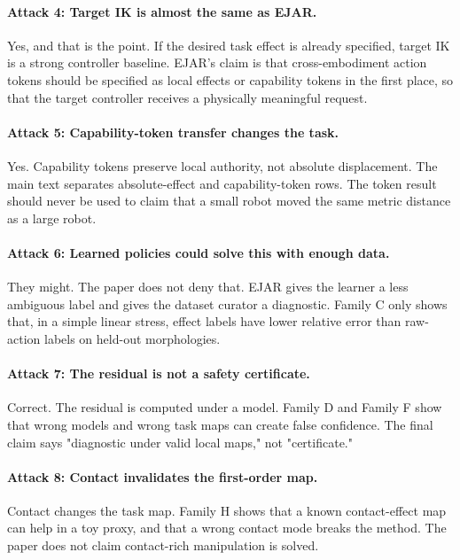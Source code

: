 \documentclass{article}
\begin{document}
\paragraph{Attack 4: Target IK is almost the same as EJAR.}
Yes, and that is the point. If the desired task effect is already specified, target IK is a strong controller baseline. EJAR's claim is that cross-embodiment action tokens should be specified as local effects or capability tokens in the first place, so that the target controller receives a physically meaningful request.

\paragraph{Attack 5: Capability-token transfer changes the task.}
Yes. Capability tokens preserve local authority, not absolute displacement. The main text separates absolute-effect and capability-token rows. The token result should never be used to claim that a small robot moved the same metric distance as a large robot.

\paragraph{Attack 6: Learned policies could solve this with enough data.}
They might. The paper does not deny that. EJAR gives the learner a less ambiguous label and gives the dataset curator a diagnostic. Family C only shows that, in a simple linear stress, effect labels have lower relative error than raw-action labels on held-out morphologies.

\paragraph{Attack 7: The residual is not a safety certificate.}
Correct. The residual is computed under a model. Family D and Family F show that wrong models and wrong task maps can create false confidence. The final claim says "diagnostic under valid local maps," not "certificate."

\paragraph{Attack 8: Contact invalidates the first-order map.}
Contact changes the task map. Family H shows that a known contact-effect map can help in a toy proxy, and that a wrong contact mode breaks the method. The paper does not claim contact-rich manipulation is solved.
\end{document}
